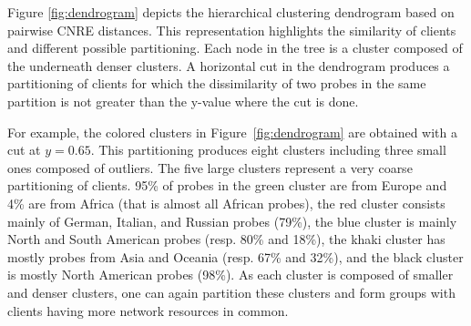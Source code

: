 

Figure \ref{fig:dendrogram} depicts the hierarchical clustering dendrogram based 
on pairwise CNRE distances.
This representation highlights the similarity of clients and different possible 
partitioning.
Each node in the tree is a cluster composed of the underneath denser clusters.
A horizontal cut in the dendrogram produces a partitioning of clients  for which
the dissimilarity of two probes in the same partition is not greater than the 
y-value where the cut is done. 

For example, the colored clusters in Figure~\ref{fig:dendrogram} are obtained 
with a cut at $y=0.65$.
This partitioning produces eight clusters including three small ones 
composed of outliers.
The five large clusters represent a very coarse partitioning of clients.
95\% of probes in the green cluster are from Europe and 4\% are from Africa 
(that is almost all African probes), the red cluster consists mainly of
German, Italian, and Russian probes (79\%), the blue cluster is mainly North and
South American probes (resp. 80\% and 18\%), the khaki cluster has mostly probes
from Asia and Oceania (resp. 67\% and 32\%), and the black cluster is mostly
North American probes (98\%).
As each cluster is composed of smaller and denser clusters, one can again partition
these clusters and form groups with clients having more network resources in common.
